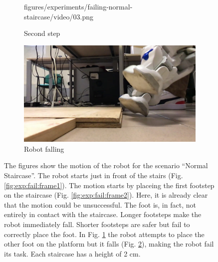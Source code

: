 \begin{figure}
\begin{subfigure}{0.48\textwidth}
      {figures/experiments/failing-normal-staircase/video/03.png}
    \caption{Second step}
    \label{fig:exp:fail:frame3}
  \end{subfigure}\hspace*{\fill}
  \begin{subfigure}{0.48\textwidth}
    \includegraphics[width=\linewidth]
      {figures/experiments/failing-normal-staircase/video/04.png}
    \caption{Robot falling}
    \label{fig:exp:fail:frame4}
  \end{subfigure}
  \caption{The figures show the motion of the robot for the scenario ``Normal 
      Staircase''. The robot starts just in front of the stairs (Fig.
      \ref{fig:exp:fail:frame1}). The motion starts by placeing the first
      footstep on the staircase (Fig. \ref{fig:exp:fail:frame2}).
      Here, it is already clear that the motion could be unsuccessful. The foot 
      is, in fact, not entirely in contact with the staircase. Longer footsteps 
      make the robot immediately fall. Shorter footsteps are safer but fail to 
      correctly place the foot. In Fig. \ref{fig:exp:fail:frame3} the robot 
      attempts to place the other foot on the platform but it falls 
      (Fig. \ref{fig:exp:fail:frame4}), making the robot fail its task.
      Each staircase has a height of 2 cm.}
  \label{fig:experiments:failing-normal-staircase:videoframes}
\end{figure}

